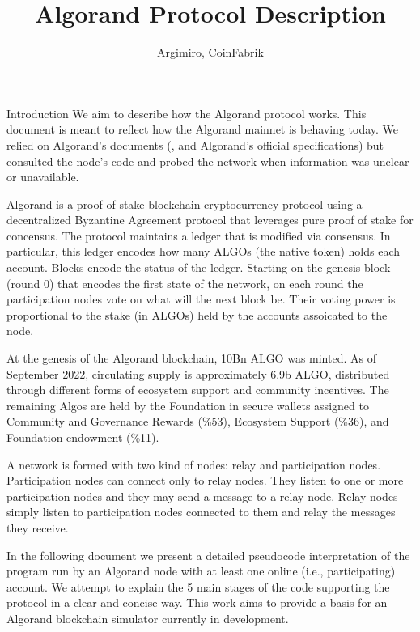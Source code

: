 \documentclass[10pt,a4paper]{article}
\author{Argimiro, CoinFabrik}
\title{Algorand Protocol Description}
\begin{document}
\maketitle
\tableofcontents

\begin{section}{Introduction}
We aim to describe how the Algorand protocol works. 
This document is meant to reflect how the Algorand mainnet is behaving
today. We relied on Algorand's documents (\cite{DBLP:conf/sosp/GiladHMVZ17},
\cite{DBLP:journals/corr/Micali16} and 
\href{https://github.com/algorandfoundation/specs}{Algorand's official specifications})
but consulted the node's code and probed the network when information was unclear or 
unavailable.

Algorand is a proof-of-stake blockchain cryptocurrency protocol 
using a decentralized Byzantine Agreement protocol that leverages 
pure proof of stake for concensus. The protocol maintains a ledger
that is modified via consensus. In particular, this ledger encodes
how many ALGOs (the native token) holds each account.
Blocks encode the status of the ledger. Starting on the genesis
block (round 0) that encodes the first state of the network, 
on each round the participation nodes vote on what will the next
block be. Their voting power is proportional to the stake (in ALGOs) 
held by the accounts assoicated to the node.

At the genesis of the Algorand blockchain, 10Bn ALGO was minted. 
As of September 2022, circulating supply is approximately 6.9b ALGO, 
distributed through different forms of ecosystem support and 
community incentives. 
The remaining Algos are held by the Foundation in secure wallets 
assigned to 
Community and Governance Rewards (\%53), 
Ecosystem Support (\%36), and 
Foundation endowment (\%11).

A network is formed with two kind of nodes: relay and participation 
nodes. Participation nodes can connect only to relay nodes. 
They listen to one or more participation nodes and they may 
send a message to a relay node. Relay nodes simply listen to participation
nodes connected to them and relay the messages they receive.

In the following document we present a detailed pseudocode interpretation 
of the program run by an Algorand node with at least one online (i.e., 
participating) account. We attempt to explain the 5 main stages of the 
code supporting the protocol in a clear and concise way.
This work aims to provide a basis for an Algorand blockchain simulator 
currently in development. 


\end{section}
\end{document}
